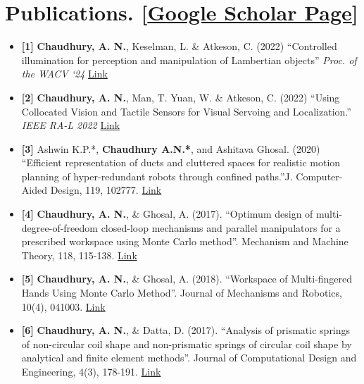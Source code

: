 \documentclass[letterpaper,11pt]{article}
\newcommand{\resumeItem}[2]{
  \item\small{
    \textbf{#1 }{ #2 \vspace{-2pt}}
  }
}
\newcommand{\resumeSubItem}[2]{\resumeItem{#1}{#2}\vspace{-4pt}}
\newcommand{\resumeSubHeadingListStart}{\begin{itemize}[label={},leftmargin=*]}
\newcommand{\resumeSubHeadingListEnd}{\end{itemize}}
\begin{document}
\section{Publications. \small{[\href{https://scholar.google.com/citations?user=rZ58Bf8AAAAJ&hl=en}{Google Scholar Page}}]}
  \resumeSubHeadingListStart

  \resumeSubItem{[1]}
      { \textbf{Chaudhury, A. N.}, Keselman, L.  \& Atkeson, C. (2022) ``Controlled illumination for perception and manipulation of Lambertian objects'' \emph{Proc. of the WACV `24} \href{https://arkadeepnc.github.io/projects/active_workspace/index.html}{Link}}
  
    \resumeSubItem{[2]}
      { \textbf{Chaudhury, A. N.}, Man, T.  Yuan, W. \& Atkeson, C. (2022) ``Using Collocated Vision and Tactile Sensors for Visual Servoing and Localization.'' \emph{IEEE RA-L 2022} \href{https://arkadeepnc.github.io/projects/collocated_vision_touch/index.html}{Link}}
      
    \resumeSubItem{[3]}
      {Ashwin K.P.*, \textbf{Chaudhury A.N.*}, and Ashitava Ghosal. (2020) ``Efficient representation of ducts and cluttered spaces for realistic motion planning of hyper-redundant robots through confined paths.''J. Computer-Aided Design, 119, 102777. \href{https://www.sciencedirect.com/science/article/pii/S0010448518304135}{Link}}
      
    \resumeSubItem{[4]}
      { \textbf{Chaudhury, A. N.}, \& Ghosal, A. (2017). ``Optimum design of multi-degree-of-freedom closed-loop mechanisms and parallel manipulators for a prescribed workspace using Monte Carlo method''. Mechanism and Machine Theory, 118, 115-138.  \href{https://www.sciencedirect.com/science/article/abs/pii/S0094114X16303184}{Link}}
      
  \resumeSubItem{[5]}
  {\textbf{Chaudhury, A. N.}, \& Ghosal, A. (2018). ``Workspace of Multi-fingered Hands Using Monte Carlo Method''. Journal of Mechanisms and Robotics, 10(4), 041003. \href{https://asmedigitalcollection.asme.org/mechanismsrobotics/article-abstract/10/4/041003/366587/Workspace-of-Multifingered-Hands-Using-Monte-Carlo?redirectedFrom=fulltext}{ Link}}
  
  \resumeSubItem{[6]}
  {\textbf{Chaudhury, A. N.}, \& Datta, D. (2017). ``Analysis of prismatic springs of non-circular coil shape and non-prismatic springs of circular coil shape by analytical and finite element methods''. Journal of Computational Design and Engineering, 4(3), 178-191.
\href{https://www.sciencedirect.com/science/article/pii/S2288430016301385}{Link}}
\resumeSubHeadingListEnd
\end{document}
